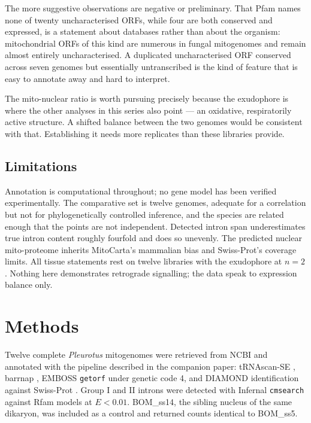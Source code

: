 The more suggestive observations are negative or preliminary. That Pfam names none of twenty
uncharacterised ORFs, while four are both conserved and expressed, is a statement about
databases rather than about the organism: mitochondrial ORFs of this kind are numerous in
fungal mitogenomes \cite{song2020bipolaris} and remain almost entirely uncharacterised. A
duplicated uncharacterised ORF conserved across seven genomes but essentially untranscribed is
the kind of feature that is easy to annotate away and hard to interpret.

The mito-nuclear ratio is worth pursuing precisely because the exudophore is where the other
analyses in this series also point --- an oxidative, respiratorily active structure. A shifted
balance between the two genomes would be consistent with that. Establishing it needs more
replicates than these libraries provide.

\subsection{Limitations}

Annotation is computational throughout; no gene model has been verified experimentally. The
comparative set is twelve genomes, adequate for a correlation but not for phylogenetically
controlled inference, and the species are related enough that the points are not independent.
Detected intron span underestimates true intron content roughly fourfold and does so unevenly.
The predicted nuclear mito-proteome inherits MitoCarta's mammalian bias and Swiss-Prot's
coverage limits. All tissue statements rest on twelve libraries with the exudophore at $n=2$.
Nothing here demonstrates retrograde signalling; the data speak to expression balance only.

\section{Methods}

Twelve complete \textit{Pleurotus} mitogenomes were retrieved from NCBI and annotated with the
pipeline described in the companion paper: tRNAscan-SE \cite{chan2021trnascan}, barrnap
\cite{seemann2013barrnap}, EMBOSS \texttt{getorf} under genetic code 4, and DIAMOND
\cite{buchfink2015diamond} identification against Swiss-Prot \cite{uniprot2023}. Group I and II
introns were detected with Infernal \cite{nawrocki2013infernal} \texttt{cmsearch} against Rfam
\cite{kalvari2021rfam} models at $E<0.01$. BOM\_ss14, the sibling nucleus of the same dikaryon,
was included as a control and returned counts identical to BOM\_ss5.

